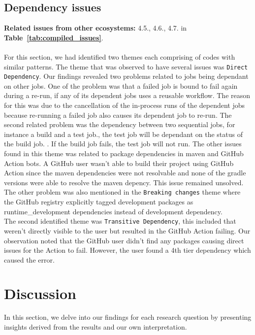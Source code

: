\documentclass[conference]{IEEEtran}
\begin{document}
\subsection*{\textbf{Dependency issues}}
\textbf{Related issues from other ecosystems:} 4.5., 4.6., 4.7. in \textbf{Table~\ref{tab:compiled_issues}}.\\\\
For this section, we had identified two themes each comprising of codes with similar patterns. The theme that was observed to have several issues was \texttt{Direct Dependency}. Our findings revealed  two problems related  to jobs being dependant on other jobs. One of the problem was that a failed job is bound to fail again during a re-run, if any of its dependent jobs uses a reusable workflow. The reason for this was due to the cancellation of the in-process runs of the dependent jobs because re-running a failed job also causes its dependent job to re-run.  The second related problem was the dependency between two sequential jobs, for instance a build and a test job., the test job will be dependant on the status of the build job. . If the build job fails, the test job will not run. The other issues found in this theme was related to package dependencies in maven and GitHub Action bots. A GitHub user wasn't able to build their project using GitHub Action since the maven dependencies were not resolvable and none of the gradle versions were able to resolve the maven depency. This issue remained unsolved. The other problem was also mentioned in the \texttt{Breaking changes} theme where the GitHub registry explicitly tagged development packages as runtime\_development dependencies instead of development dependency.\\
	The second identified theme was \texttt{Transitive Dependency}, this included that weren't directly visible to the user but resulted in the GitHub Action failing. Our observation noted that the GitHub user didn't find any packages causing direct issues for the Action to fail. However, the user found a 4th tier dependency which caused the error.
\section{Discussion}
	In this section, we delve into our findings for each research question by presenting insights derived from the results and our own interpretation.\\
\end{document}
